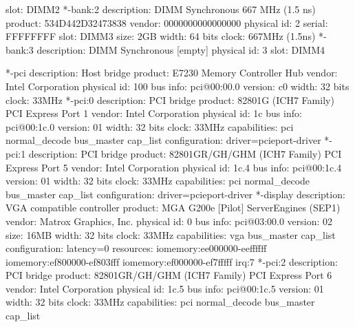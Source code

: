 \documentclass[mingoth,a4paper]{jsarticle}
\begin{document}
{{{{{{{{{{{\begin{commandline}
             slot: DIMM2
        *-bank:2
             description: DIMM Synchronous 667 MHz (1.5 ns)
             product: 534D442D32473838
             vendor: 0000000000000000
             physical id: 2
             serial: FFFFFFFF
             slot: DIMM3
             size: 2GB
             width: 64 bits
             clock: 667MHz (1.5ns)
        *-bank:3
             description: DIMM Synchronous [empty]
             physical id: 3
             slot: DIMM4
\end{commandline}
\begin{commandline}
     *-pci
          description: Host bridge
          product: E7230 Memory Controller Hub
          vendor: Intel Corporation
          physical id: 100
          bus info: pci@00:00.0
          version: c0
          width: 32 bits
          clock: 33MHz
        *-pci:0
             description: PCI bridge
             product: 82801G (ICH7 Family) PCI Express Port 1
             vendor: Intel Corporation
             physical id: 1c
             bus info: pci@00:1c.0
             version: 01
             width: 32 bits
             clock: 33MHz
             capabilities: pci normal_decode bus_master cap_list
             configuration: driver=pcieport-driver
        *-pci:1
             description: PCI bridge
             product: 82801GR/GH/GHM (ICH7 Family) PCI Express Port 5
             vendor: Intel Corporation
             physical id: 1c.4
             bus info: pci@00:1c.4
             version: 01
             width: 32 bits
             clock: 33MHz
             capabilities: pci normal_decode bus_master cap_list
             configuration: driver=pcieport-driver
           *-display
                description: VGA compatible controller
                product: MGA G200e [Pilot] ServerEngines (SEP1)
                vendor: Matrox Graphics, Inc.
                physical id: 0
                bus info: pci@03:00.0
                version: 02
                size: 16MB
                width: 32 bits
                clock: 33MHz
                capabilities: vga bus_master cap_list
                configuration: latency=0
                resources: iomemory:ee000000-eeffffff iomemory:ef800000-ef803fff iomemory:ef000000-ef7fffff irq:7
        *-pci:2
             description: PCI bridge
             product: 82801GR/GH/GHM (ICH7 Family) PCI Express Port 6
             vendor: Intel Corporation
             physical id: 1c.5
             bus info: pci@00:1c.5
             version: 01
             width: 32 bits
             clock: 33MHz
             capabilities: pci normal_decode bus_master cap_list

\end{commandline}}}}}}}}}}}}
\end{document}
